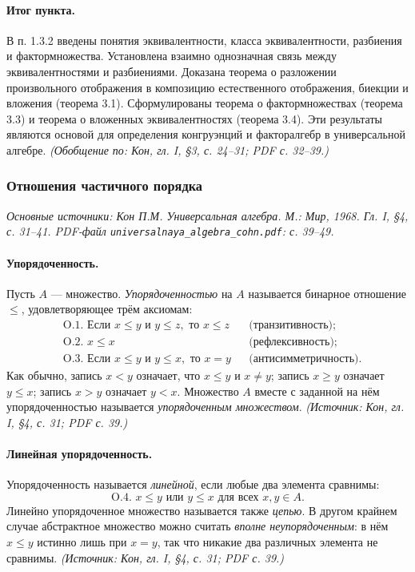 \documentclass[a4paper,12pt]{article}
\begin{document}
\paragraph{Итог пункта.}
В п. 1.3.2 введены понятия эквивалентности, класса эквивалентности, разбиения и фактормножества. Установлена взаимно однозначная связь между эквивалентностями и разбиениями. Доказана теорема о разложении произвольного отображения в композицию естественного отображения, биекции и вложения (теорема 3.1). Сформулированы теорема о фактормножествах (теорема 3.3) и теорема о вложенных эквивалентностях (теорема 3.4). Эти результаты являются основой для определения конгруэнций и факторалгебр в универсальной алгебре.
\textit{(Обобщение по: Кон, гл. I, §3, с. 24--31; PDF с. 32--39.)}

\subsubsection{Отношения частичного порядка}

\noindent\textit{Основные источники: Кон П.М. Универсальная алгебра. М.: Мир, 1968. Гл. I, §4, с. 31--41. PDF-файл \texttt{universalnaya\_algebra\_cohn.pdf}: с. 39--49.}

\paragraph{Упорядоченность.}
Пусть \(A\) — множество. \emph{Упорядоченностью} на \(A\) называется бинарное отношение \(\le\), удовлетворяющее трём аксиомам:
\[
\begin{aligned}
&\text{O.1. Если }x\le y\text{ и }y\le z,\text{ то }x\le z &&\text{(транзитивность)};\\
&\text{O.2. }x\le x &&\text{(рефлексивность)};\\
&\text{O.3. Если }x\le y\text{ и }y\le x,\text{ то }x=y &&\text{(антисимметричность)}.
\end{aligned}
\]
Как обычно, запись \(x<y\) означает, что \(x\le y\) и \(x\ne y\); запись \(x\ge y\) означает \(y\le x\); запись \(x>y\) означает \(y<x\). Множество \(A\) вместе с заданной на нём упорядоченностью называется \emph{упорядоченным множеством}.
\textit{(Источник: Кон, гл. I, §4, с. 31; PDF с. 39.)}

\paragraph{Линейная упорядоченность.}
Упорядоченность называется \emph{линейной}, если любые два элемента сравнимы:
\[
\text{O.4. }x\le y\text{ или }y\le x\text{ для всех }x,y\in A.
\]
Линейно упорядоченное множество называется также \emph{цепью}. В другом крайнем случае абстрактное множество можно считать \emph{вполне неупорядоченным}: в нём \(x\le y\) истинно лишь при \(x=y\), так что никакие два различных элемента не сравнимы.
\textit{(Источник: Кон, гл. I, §4, с. 31; PDF с. 39.)}
\end{document}
